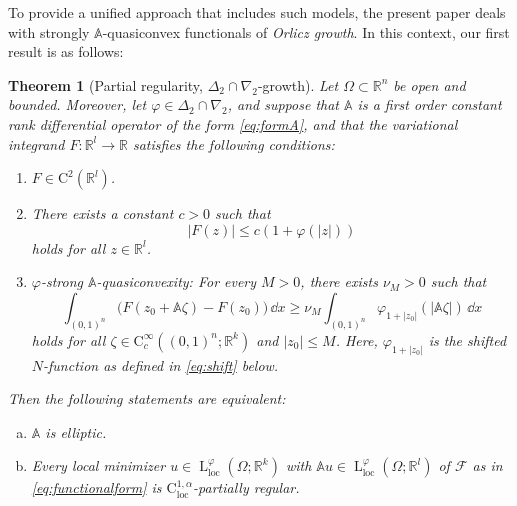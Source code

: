 \documentclass[a4paper,11pt]{amsart}
\numberwithin{equation}{section}
\newcommand{\lebe}{\operatorname{L}}
\newtheorem{satz}[defi]{Theorem}
\begin{document}
	
	To provide a unified approach that includes such models, the present paper deals with strongly $\mathbb{A}$-quasiconvex functionals of \emph{Orlicz growth}. In this context, our first result is as follows: 
	\begin{satz}[Partial regularity, $\Delta_2 \cap \nabla_2$-growth] \label{OrliczMainThm}
		Let $\Omega \subset \mathbb{R}^n$ be open and bounded. Moreover, let $\varphi \in \Delta_2 \cap \nabla_2$, and suppose that $\mathbb{A}$ is a first order constant rank differential operator of the form \eqref{eq:formA}, and that the variational integrand $F: {\mathbb{R}^l} \to \mathbb{R}$ satisfies the following conditions:
		\begin{enumerate}[label=(F\arabic*)]
			\item $F \in \mathrm{C}^{2}({\mathbb{R}^l})$. \label{F1}
			\item There exists a constant $c > 0$ such that $$|F(z)| \leq c(1+\varphi(|z|))$$ holds for all $z \in {\mathbb{R}^l}$. \label{F2}
			\item\label{item:F3} $\varphi$-strong $\mathbb{A}$-quasiconvexity: For every $M > 0$, there exists $\nu_M > 0$ such that
			\[
			\int_{(0,1)^n} \bigl( F(z_0 + \mathbb{A} \zeta) - F(z_0) \bigr) \, \dd{x} \geq \nu_M \int_{(0,1)^n} \varphi_{1+|z_0|}(|\mathbb{A} \zeta|) \, \dd{x}
			\]
			holds for all $\zeta \in \mathrm{C}^{\infty}_c((0,1)^n;{\mathbb{R}^k})$ and $|z_0| \leq M$. Here, $\varphi_{1+|z_0|}$ is the \emph{shifted $N$-function} as defined in \eqref{eq:shift} below. \label{F3}
		\end{enumerate}
		Then the following statements are equivalent:
		\begin{enumerate}[(a)]
			\item $\mathbb{A}$ is elliptic.
			\item Every local minimizer $u \in \lebe^\varphi_\mathrm{loc}(\Omega;  {\mathbb{R}^k})$ with $\mathbb{A}u \in \lebe^\varphi_\mathrm{loc}(\Omega;  {\mathbb{R}^l})$ of $\mathcal{F}$ as in \eqref{eq:functionalform}  is $\mathrm{C}^{1,\alpha}_{\mathrm{loc}}$-partially regular.
		\end{enumerate}
	\end{satz}
	
\end{document}
